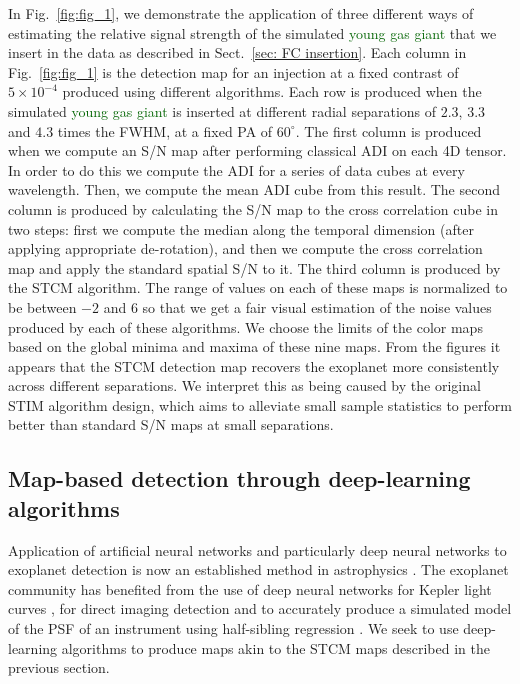 \documentclass{aa}
\newcommand{\newchange}[1]{\textcolor{darkgreen}{#1}}
\begin{document}
In Fig.~\ref{fig:fig_1}, we demonstrate the application of three different ways of estimating the relative signal strength of the simulated \newchange{young gas giant} that we insert in the data as described in Sect.~\ref{sec: FC insertion}.
Each column in Fig.~\ref{fig:fig_1} is the detection map for an injection at a fixed contrast of $5\times 10^{-4}$ produced using different algorithms. %
Each row is produced when the simulated \newchange{young gas giant} is inserted at different radial separations of $2.3$, $3.3$ and $4.3$ times the FWHM, at a fixed PA of $60^{\circ}$.
The first column is produced when we compute an S/N map \citep[as defined in][]{2014Mawet} after performing classical ADI on each 4D tensor.
In order to do this we compute the ADI for a series of data cubes at every wavelength. Then, we compute the mean ADI cube from this result. 
The second column is produced by calculating the S/N map \citep[as defined in][]{2014Mawet} to the cross correlation cube in two steps: first we compute the median along the temporal dimension (after applying appropriate de-rotation), and then we compute the cross correlation map and apply the standard spatial S/N to it.
The third column is produced by the STCM algorithm.
The range of values on each of these maps is normalized to be between $-2$ and $6$ so that we get a fair visual estimation of the noise values produced by each of these algorithms.
We choose the limits of the color maps based on the global minima and maxima of these nine maps.
From the figures it appears that the STCM detection map recovers the exoplanet more consistently across different separations. We interpret this as being caused by the original STIM algorithm design, which aims to alleviate small sample statistics to perform better than standard S/N maps at small separations.

\subsection{Map-based detection through deep-learning algorithms}\label{sec:ML algorithms}

Application of artificial neural networks and particularly deep neural networks to exoplanet detection is now an established method in astrophysics \citep[][]{2020Fluke}.
The exoplanet community has benefited from the use of deep neural networks for Kepler light curves \cite{2018Pearson}, for direct imaging detection \cite{2018Gomez} and to accurately produce a simulated model of the PSF of an instrument using half-sibling regression \citep{2022Gebhard}.
We seek to use deep-learning algorithms to produce maps akin to the STCM maps described in the previous section.
\end{document}
